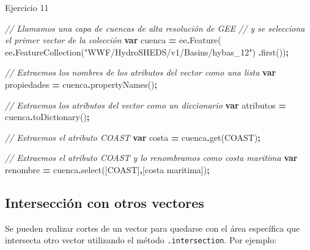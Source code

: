 \documentclass[
  12pt,
  letterpaper,
  twoside]{book}
\newenvironment{Shaded}{\begin{snugshade}}{\end{snugshade}}
\newcommand{\CommentTok}[1]{\textcolor[rgb]{0.56,0.35,0.01}{\textit{#1}}}
\newcommand{\FunctionTok}[1]{\textcolor[rgb]{0.00,0.00,0.00}{#1}}
\newcommand{\KeywordTok}[1]{\textcolor[rgb]{0.13,0.29,0.53}{\textbf{#1}}}
\newcommand{\NormalTok}[1]{#1}
\newcommand{\OperatorTok}[1]{\textcolor[rgb]{0.81,0.36,0.00}{\textbf{#1}}}
\newcommand{\StringTok}[1]{\textcolor[rgb]{0.31,0.60,0.02}{#1}}
\begin{document}
Ejercicio 11

\begin{Shaded}
\begin{Highlighting}[]
\CommentTok{// Llamamos una capa de cuencas de alta resolución de GEE}
\CommentTok{// y se selecciona el primer vector de la colección}
\KeywordTok{var}\NormalTok{ cuenca }\OperatorTok{=}\NormalTok{ ee}\OperatorTok{.}\FunctionTok{Feature}\NormalTok{(}
\NormalTok{  ee}\OperatorTok{.}\FunctionTok{FeatureCollection}\NormalTok{(}\StringTok{"WWF/HydroSHEDS/v1/Basins/hybas\_12"}\NormalTok{)}
  \OperatorTok{.}\FunctionTok{first}\NormalTok{())}\OperatorTok{;}

\CommentTok{// Extraemos los nombres de los atributos del vector como una lista}
\KeywordTok{var}\NormalTok{ propiedades }\OperatorTok{=}\NormalTok{ cuenca}\OperatorTok{.}\FunctionTok{propertyNames}\NormalTok{()}\OperatorTok{;}

\CommentTok{// Extraemos los atributos del vector como un diccionario}
\KeywordTok{var}\NormalTok{ atributos }\OperatorTok{=}\NormalTok{ cuenca}\OperatorTok{.}\FunctionTok{toDictionary}\NormalTok{()}\OperatorTok{;}

\CommentTok{// Extraemos el atributo \textquotesingle{}COAST\textquotesingle{}}
\KeywordTok{var}\NormalTok{ costa }\OperatorTok{=}\NormalTok{ cuenca}\OperatorTok{.}\FunctionTok{get}\NormalTok{(}\StringTok{\textquotesingle{}COAST\textquotesingle{}}\NormalTok{)}\OperatorTok{;}

\CommentTok{// Extraemos el atributo \textquotesingle{}COAST\textquotesingle{} y lo renombramos como \textquotesingle{}costa maritima\textquotesingle{}}
\KeywordTok{var}\NormalTok{ renombre }\OperatorTok{=}\NormalTok{ cuenca}\OperatorTok{.}\FunctionTok{select}\NormalTok{([}\StringTok{\textquotesingle{}COAST\textquotesingle{}}\NormalTok{]}\OperatorTok{,}\NormalTok{[}\StringTok{\textquotesingle{}costa maritima\textquotesingle{}}\NormalTok{])}\OperatorTok{;}
\end{Highlighting}
\end{Shaded}

\hypertarget{intersecciuxf3n-con-otros-vectores}{%
\subsection*{Intersección con otros vectores}\label{intersecciuxf3n-con-otros-vectores}}

Se pueden realizar cortes de un vector para quedarse con el área específica que intersecta otro vector utilizando el método \texttt{.intersection}. Por ejemplo:
\end{document}
